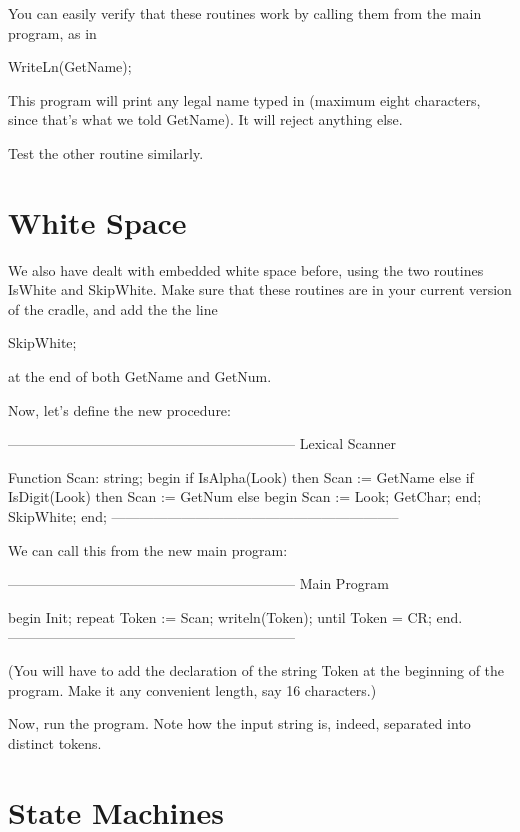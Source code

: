 \documentclass[float=false, crop=false]{standalone}
\begin{document}
You can easily verify that these routines work by calling them from the main
program, as in

     WriteLn(GetName);

This program will print any legal name typed in (maximum eight characters, since
that's what we told GetName). It will reject anything else.

Test the other routine similarly.


\section{White Space}

We also have dealt with embedded white space before, using the two routines
IsWhite and SkipWhite. Make sure that these routines are in your current version
of the cradle, and add the the line

     SkipWhite;

at the end of both GetName and GetNum.

Now, let's define the new procedure:

\begin{code}
{--------------------------------------------------------------}
{ Lexical Scanner }

Function Scan: string;
begin
   if IsAlpha(Look) then
      Scan := GetName
   else if IsDigit(Look) then
      Scan := GetNum
   else begin
      Scan := Look;
      GetChar;
   end;
   SkipWhite;
end;
{--------------------------------------------------------------}
\end{code}

We can call this from the new main program:

\begin{code}
{--------------------------------------------------------------}
{ Main Program }


begin
   Init;
   repeat
      Token := Scan;
      writeln(Token);
   until Token = CR;
end.
{--------------------------------------------------------------}
\end{code}

(You will have to add the declaration of the string Token  at the
beginning of the program.  Make it any convenient length,  say 16
characters.)

Now,  run the program.  Note how the  input  string  is,  indeed,
separated into distinct tokens.


\section{State Machines}
\end{document}
